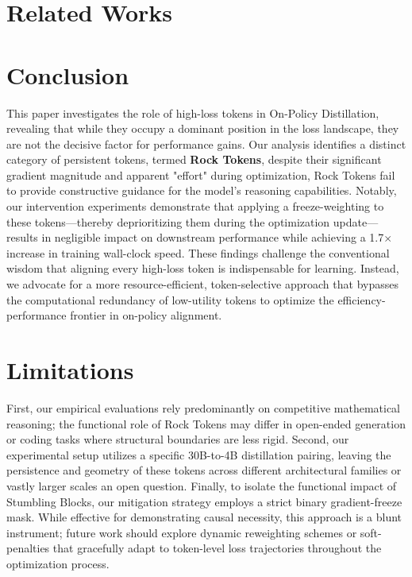 \documentclass{article}
\begin{document}
\section{Related Works}





\section{Conclusion}
This paper investigates the role of high-loss tokens in On-Policy Distillation, revealing that while they occupy a dominant position in the loss landscape, they are not the decisive factor for performance gains. Our analysis identifies a distinct category of persistent tokens, termed \textbf{Rock Tokens}, despite their significant gradient magnitude and apparent "effort" during optimization, Rock Tokens fail to provide constructive guidance for the model's reasoning capabilities. Notably, our intervention experiments demonstrate that applying a freeze-weighting to these tokens—thereby deprioritizing them during the optimization update—results in negligible impact on downstream performance while achieving a 1.7$\times$ increase in training wall-clock speed. These findings challenge the conventional wisdom that aligning every high-loss token is indispensable for learning. Instead, we advocate for a more resource-efficient, token-selective approach that bypasses the computational redundancy of low-utility tokens to optimize the efficiency-performance frontier in on-policy alignment.







{
\small
 

}

\medskip





\appendix

\section{Limitations}
First, our empirical evaluations rely predominantly on competitive mathematical reasoning; the functional role of Rock Tokens may differ in open-ended generation or coding tasks where structural boundaries are less rigid. Second, our experimental setup utilizes a specific 30B-to-4B distillation pairing, leaving the persistence and geometry of these tokens across different architectural families or vastly larger scales an open question. Finally, to isolate the functional impact of Stumbling Blocks, our mitigation strategy employs a strict binary gradient-freeze mask. While effective for demonstrating causal necessity, this approach is a blunt instrument; future work should explore dynamic reweighting schemes or soft-penalties that gracefully adapt to token-level loss trajectories throughout the optimization process.
\end{document}
